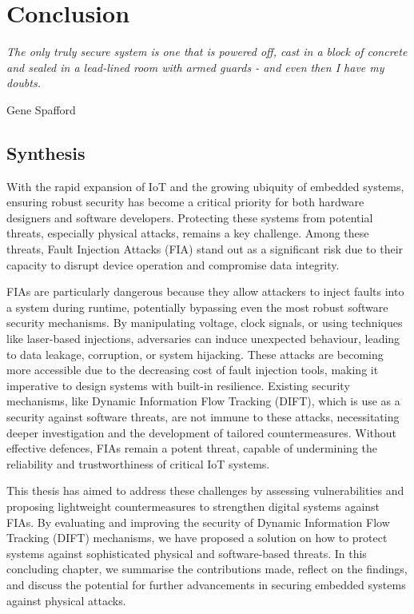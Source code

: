 \chapter{Conclusion}
\label{chapter:conclusion}

\epigraph{\textit{The only truly secure system is one that is powered off, cast in a block of concrete and sealed in a lead-lined room with armed guards - and even then I have my doubts.}}{Gene Spafford}

\minitoc

\section{Synthesis}

With the rapid expansion of IoT and the growing ubiquity of embedded systems, ensuring robust security has become a critical priority for both hardware designers and software developers. Protecting these systems from potential threats, especially physical attacks, remains a key challenge. Among these threats, Fault Injection Attacks (FIA) stand out as a significant risk due to their capacity to disrupt device operation and compromise data integrity.

FIAs are particularly dangerous because they allow attackers to inject faults into a system during runtime, potentially bypassing even the most robust software security mechanisms. By manipulating voltage, clock signals, or using techniques like laser-based injections, adversaries can induce unexpected behaviour, leading to data leakage, corruption, or system hijacking. These attacks are becoming more accessible due to the decreasing cost of fault injection tools, making it imperative to design systems with built-in resilience. Existing security mechanisms, like Dynamic Information Flow Tracking (DIFT), which is use as a security against software threats, are not immune to these attacks, necessitating deeper investigation and the development of tailored countermeasures. Without effective defences, FIAs remain a potent threat, capable of undermining the reliability and trustworthiness of critical IoT systems.

This thesis has aimed to address these challenges by assessing vulnerabilities and proposing lightweight countermeasures to strengthen digital systems against FIAs. By evaluating and improving the security of Dynamic Information Flow Tracking (DIFT) mechanisms, we have proposed a solution on how to protect systems against sophisticated physical and software-based threats. In this concluding chapter, we summarise the contributions made, reflect on the findings, and discuss the potential for further advancements in securing embedded systems against physical attacks.

